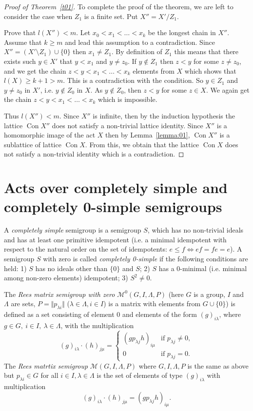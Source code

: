 \documentclass{birkau}
\numberwithin{equation}{section}
\theoremstyle{plain}
\theoremstyle{definition}
\DeclareMathOperator{\Con}{Con}
\begin{document}
\begin{proof}[Proof of Theorem~\ref{t01}]
		To complete the proof of the theorem, we are left to consider the case when $Z_1$ is a finite set. Put $X'' = X'/{Z_1}$.
		
		Prove that $l(X'') < m$. Let $ x_0 < x_1 < \ldots < x_k $ be the longest chain in $X''$. Assume that $k \geqslant m$ and lead this assumption to a contradiction. Since $X'' = (X' \setminus Z_1) \cup \{0\}$ then $ x_1 \neq Z_1$. By definition of $Z_1$ this means that there exists such $y \in X'$ that $y < x_1$ and $y \neq z_0$. If $y \notin Z_1$ then $z < y$ for some $z \neq z_0$, and we get the chain $z < y < x_1 < \ldots < x_k $ elements from $X$ which shows that $l(X) \geqslant k+1 > m$. This is a contradiction with the condition. So $y \in Z_1$ and $y \neq z_0$ in $X'$, i.e. $y \not \in Z_0$ in $X$. As $y \notin Z_0$, then $ z < y$ for some $z \in X$. We again get the chain $ z < y < x_1 < \ldots < x_k $ which is impossible.
		
		Thus $ l(X'') < m$. Since $X''$ is infinite, then by the induction hypothesis the lattice $\Con X''$ does not satisfy a non-trivial lattice identity. Since $X''$ is a homomorphic image of the act $X$ then by Lemma~\ref{lemma:01}, $\Con X''$ is a sublattice of lattice $\Con X$. From this, we obtain that the lattice $\Con X$ does not satisfy a non-trivial identity which is a contradiction.
	\end{proof}
	
	\section{Acts over completely simple and completely 0-simple semigroups}
	
    A \textit{completely simple} semigroup is a semigroup $S$, which has no non-trivial ideals and has at least one primitive idempotent (i.e. a minimal idempotent with respect to the natural order on the set of idempotents: $e \leqslant f \Leftrightarrow ef=fe=e$). A semigroup $S$ with zero is called \textit{completely 0-simple} if the following conditions are held: 1) $S$ has no ideals other than $\{0\}$ and $S$; 2) $S$ has a 0-minimal (i.e. minimal among non-zero elements) idempotent; 3) $S^2 \neq 0$.
	
	The \textit{Rees matrix semigroup with zero} $\mathcal{M}^0(G,I,\Lambda,P)$ (here $G$ is a group, $I$ and $\Lambda$ are sets, $P=\Vert p_{\lambda i} \Vert$ ($\lambda \in \Lambda, i \in I$) is a matrix with elements from $G \cup \{0\}$) is defined as a set consisting of element 0 and elements of the form $(g)_{i\lambda}$, where $g \in G,\ i \in I,\ \lambda \in \Lambda$, with the multiplication
		$$ (g)_{i\lambda} \cdot (h)_{j\mu} =
			\begin{cases}
				(gp_{\lambda j}h)_{i\mu} & \text{if } p_{\lambda j} \neq 0,\\
				0 & \text{if } p_{\lambda j} = 0.
			\end{cases}
		$$
	The \textit{Rees matrtix semigroup} $\mathcal{M}(G,I,\Lambda,P)$ where $G,I,\Lambda,P$ is the same as above but $p_{\lambda i} \in G$ for all $i \in I,\lambda \in \Lambda$ is the set of elements of type $(g)_{i\lambda}$ with multiplication $$ (g)_{i\lambda} \cdot (h)_{j\mu} = (gp_{\lambda j}h)_{i\mu}. $$
	
\end{document}
